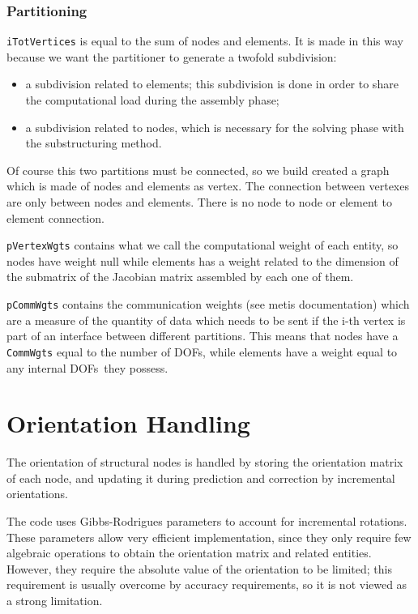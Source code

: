 \documentclass[10pt,dvips,fleqn,subeqn]{report}
\newcommand{\dofs}{DOFs}
\begin{document}
\subsection{Partitioning}
\texttt{iTotVertices} is equal to the sum of nodes and elements. 
It is made in this way because we want the partitioner 
to generate a twofold subdivision:
\begin{itemize}
\item a subdivision related to elements; 
this subdivision is done in order to share the computational 
load during the assembly phase;
\item a subdivision related to nodes, 
which is necessary for the solving phase with the substructuring method.
\end{itemize}
Of course this two partitions must be connected, 
so we build created a graph which is made of nodes and elements as vertex. 
The connection between vertexes are only between nodes and elements. 
There is no node to node or element to element connection.

\texttt{pVertexWgts} 
contains what we call the computational weight of each entity, 
so nodes have weight null while elements has a weight related to 
the dimension of the submatrix of the Jacobian matrix assembled
by each one of them.

\texttt{pCommWgts} contains the communication weights 
(see metis documentation) which are a measure of the quantity 
of data which needs to be sent if the i-th vertex is part 
of an interface between different partitions. 
This means that nodes have a \texttt{CommWgts} equal to the number 
of \dofs, while elements have a weight equal
to any internal \dofs\ they possess.


\chapter{Orientation Handling}
The orientation of structural nodes is handled by storing the orientation
matrix of each node, and updating it during prediction and correction 
by incremental orientations.

The code uses Gibbs-Rodrigues parameters to account for incremental 
rotations.
These parameters allow very efficient implementation, since they
only require few algebraic operations to obtain the orientation matrix
and related entities.
However, they require the absolute value of the orientation to be limited;
this requirement is usually overcome by accuracy requirements,
so it is not viewed as a strong limitation.
\end{document}
